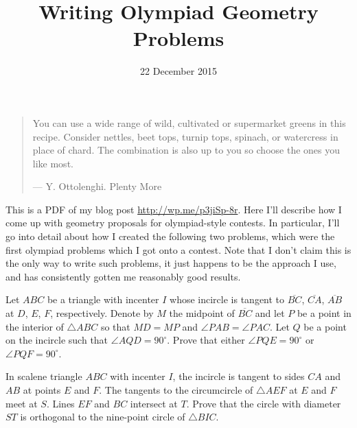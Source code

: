 \documentclass[11pt]{scrartcl}
\begin{document}
\title{Writing Olympiad Geometry Problems}
\date{22 December 2015}
\maketitle

\begin{quote}
  \sffamily\small
  You can use a wide range of wild, cultivated or supermarket greens in this recipe.
  Consider nettles, beet tops, turnip tops, spinach, or watercress in place of chard.
  The combination is also up to you so choose the ones you like most.

  \medskip

  --- Y. Ottolenghi. Plenty More
\end{quote}

This is a PDF of my blog post \url{http://wp.me/p3jiSp-8r}.
Here I'll describe how I come up with geometry proposals
for olympiad-style contests. In particular, I'll go into detail
about how I created the following two problems,
which were the first olympiad problems which I got onto a contest.
Note that I don't claim this is the only way to write such problems,
it just happens to be the approach I use, and has consistently
gotten me reasonably good results.

\begin{olyprob}
  Let $ABC$ be a triangle with incenter $I$ whose incircle is tangent to
  $\overline{BC}$, $\overline{CA}$, $\overline{AB}$ at $D$, $E$, $F$,
  respectively.  Denote by $M$ the midpoint of $\overline{BC}$ and
  let $P$ be a point in the interior of $\triangle ABC$
  so that $MD = MP$ and $\angle PAB = \angle PAC$.
  Let $Q$ be a point on the incircle such that $\angle AQD = 90^{\circ}$.
  Prove that either $\angle PQE = 90^{\circ}$ or $\angle PQF = 90^{\circ}$.
\end{olyprob}

\begin{olyprob}
  In scalene triangle $ABC$ with incenter $I$, the incircle is tangent to
  sides $CA$ and $AB$ at points $E$ and $F$.
  The tangents to the circumcircle of $\triangle AEF$ at $E$ and $F$ meet at $S$.
  Lines $EF$ and $BC$ intersect at $T$.
  Prove that the circle with diameter $ST$ is orthogonal to
  the nine-point circle of $\triangle BIC$.
\end{olyprob}
\end{document}
